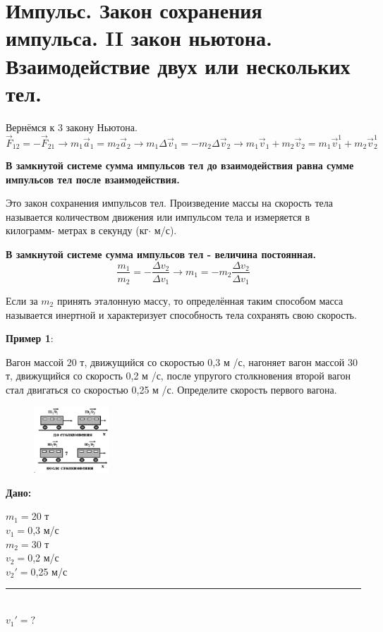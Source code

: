 \documentclass[a6paper, 11pt]{diss_4}
\renewcommand{\'}{\,'}
\begin{document}
\section{Импульс. Закон сохранения импульса. II закон ньютона.
Взаимодействие двух или нескольких тел.}

Вернёмся к 3 закону Ньютона.
\[
\vec{F}_12=-\vec{F}_21\to m_1\vec{a}_1=m_2\vec{a}_2\to
m_1\Delta\vec{v}_1=-m_2\Delta\vec{v}_2\to
m_1\vec{v}_1+m_2\vec{v}_2=m_1\vec{v}_1^1+m_2\vec{v}_2^1
\]

  \textbf{В замкнутой системе сумма импульсов тел до взаимодействия равна сумме
импульсов тел после взаимодействия.}

  Это закон сохранения импульсов тел. Произведение массы на скорость тела
называется количеством движения или импульсом тела и измеряется в килограмм-
метрах в секунду (кг$\cdot$ м/с).

\textbf{  В замкнутой системе сумма импульсов тел - величина
постоянная. }
\[
\frac{m_1}{m_2}=-\frac{\Delta v_2}{\Delta v_1}\to
m_1=-m_2\frac{\Delta v_2}{\Delta v_1}
\]

 Если за $m_2$ принять эталонную массу, то определённая таким способом масса
называется инертной и характеризует способность тела сохранять свою скорость.

\textbf{Пример 1}:

 Вагон массой 20 т, движущийся со скоростью 0,3 м /с, нагоняет вагон массой 30
т, движущийся со скорость 0,2 м /с, после упругого столкновения второй вагон
стал двигаться со скоростью 0,25 м /с. Определите скорость первого вагона.
\begin{figure}
\includegraphics[width=0.25\textwidth]{img/img_27.eps}
\label{r27}
\end{figure}

\hspace{1cm}\textbf{Дано:}\hspace{.3cm}
\parbox[t]{4cm}{
$m_1=$20 т\\
$v_1=$0,3 м/с\\
$m_2=$30 т\\
$v_2=$0,2 м/с\\
$v_2'=$0,25 м/с\\
\rule{4cm}{.4pt}\\
$v_1'=?$\\
}
\end{document}
